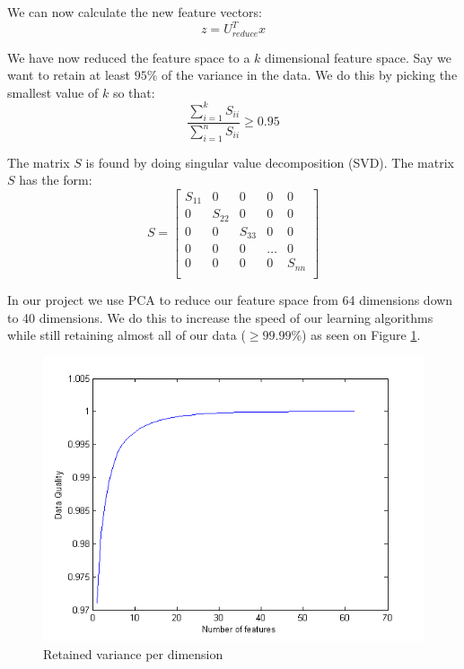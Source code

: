 We can now calculate the new feature vectors:
\begin{equation}
z = U_{reduce}^Tx
\end{equation}

We have now reduced the feature space to a $k$ dimensional feature space.
Say we want to retain at least $95\%$ of the variance in the data.
We do this by picking the smallest value of $k$ so that:
\begin{equation}
\frac{\displaystyle\sum^{k}_{i=1} S_{ii}}{\displaystyle\sum^{n}_{i=1} S_{ii}} \geq 0.95
\end{equation}

The matrix $S$ is found by doing singular value decomposition (SVD). The matrix $S$ has the form:
\begin{equation}
S =  
\begin{bmatrix}
S_{11} & 0 & 0 & 0 & 0 \\
0 & S_{22} & 0 & 0 & 0 \\
0 & 0 & S_{33} & 0 & 0 \\
0 & 0 & 0 & \dots & 0 \\
0 & 0 & 0 & 0 & S_{nn} \\
\end{bmatrix}
\end{equation}

In our project we use PCA to reduce our feature space from 64 dimensions down to 40 dimensions.
We do this to increase the speed of our learning algorithms while still retaining almost all of our data ($\geq 99.99\%$) as seen on Figure \ref{fig:pca-on-our-data}.

\begin{figure}
\centering
\includegraphics[scale = 0.8]{images/pca-on-our-data}
\caption{ Retained variance per dimension}
\label{fig:pca-on-our-data}
\end{figure}

